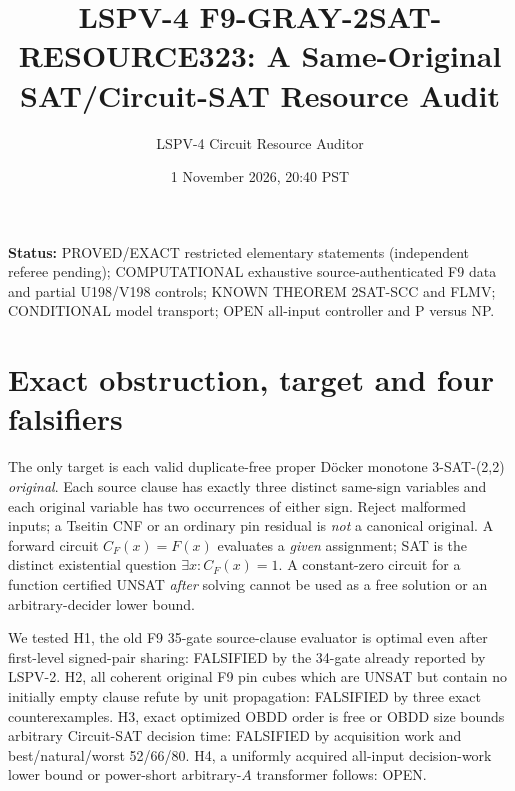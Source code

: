 \documentclass[11pt]{article}
\title{LSPV-4 F9-GRAY-2SAT-RESOURCE323: A Same-Original SAT/Circuit-SAT Resource Audit}
\author{LSPV-4 Circuit Resource Auditor}
\date{1 November 2026, 20:40 PST}
\begin{document}
\maketitle
\noindent\textbf{Status:} PROVED/EXACT restricted elementary statements (independent referee pending); COMPUTATIONAL exhaustive source-authenticated F9 data and partial U198/V198 controls; KNOWN THEOREM 2SAT-SCC and FLMV; CONDITIONAL model transport; OPEN all-input controller and P versus NP.

\section{Exact obstruction, target and four falsifiers}
The only target is each valid duplicate-free proper D\"ocker monotone 3-SAT-(2,2) \emph{original}. Each source clause has exactly three distinct same-sign variables and each original variable has two occurrences of either sign. Reject malformed inputs; a Tseitin CNF or an ordinary pin residual is \emph{not} a canonical original. A forward circuit $C_F(x)=F(x)$ evaluates a \emph{given} assignment; SAT is the distinct existential question $\exists x:C_F(x)=1$. A constant-zero circuit for a function certified UNSAT \emph{after} solving cannot be used as a free solution or an arbitrary-decider lower bound.

We tested H1, the old F9 35-gate source-clause evaluator is optimal even after first-level signed-pair sharing: FALSIFIED by the 34-gate already reported by LSPV-2. H2, all coherent original F9 pin cubes which are UNSAT but contain no initially empty clause refute by unit propagation: FALSIFIED by three exact counterexamples. H3, exact optimized OBDD order is free or OBDD size bounds arbitrary Circuit-SAT decision time: FALSIFIED by acquisition work and best/natural/worst 52/66/80. H4, a uniformly acquired all-input decision-work lower bound or power-short arbitrary-$A$ transformer follows: OPEN.
\end{document}
